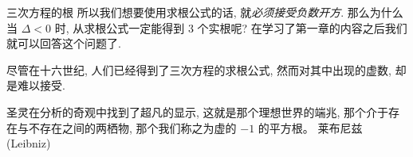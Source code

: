 \begin{frame}{三次方程的根\noexer}
	\onslide<+->
	所以我们想要使用求根公式的话, 就\emph{必须接受负数开方}.
	\onslide<+->
	那么为什么当 $\Delta<0$ 时, 从求根公式一定能得到 $3$ 个实根呢?
	\onslide<+->
	在学习了第一章的内容之后我们就可以回答这个问题了.

	\onslide<+->
	尽管在十六世纪, 人们已经得到了三次方程的求根公式, 然而对其中出现的虚数, 却是难以接受.

	\onslide<+->
	\begin{quote@*}
		圣灵在分析的奇观中找到了超凡的显示, 这就是那个理想世界的端兆, 那个介于存在与不存在之间的两栖物, 那个我们称之为虚的 $-1$ 的平方根。
	\tcblower
	莱布尼兹 (Leibniz)
	\end{quote@*}
\end{frame}
